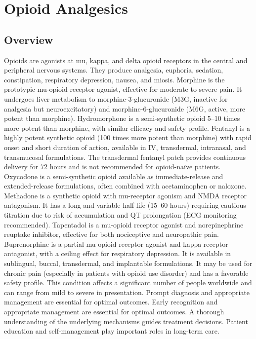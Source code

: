 \chapter{Opioid Analgesics}
\label{sec:Opioid Analgesics}

\section{Overview}
Opioids are agonists at mu, kappa, and delta opioid receptors in the central and peripheral nervous systems. They produce analgesia, euphoria, sedation, constipation, respiratory depression, nausea, and miosis. Morphine is the prototypic mu-opioid receptor agonist, effective for moderate to severe pain. It undergoes liver metabolism to morphine-3-glucuronide (M3G, inactive for analgesia but neuroexcitatory) and morphine-6-glucuronide (M6G, active, more potent than morphine). Hydromorphone is a semi-synthetic opioid 5--10 times more potent than morphine, with similar efficacy and safety profile. Fentanyl is a highly potent synthetic opioid (100 times more potent than morphine) with rapid onset and short duration of action, available in IV, transdermal, intranasal, and transmucosal formulations. The transdermal fentanyl patch provides continuous delivery for 72 hours and is not recommended for opioid-na{\"i}ve patients. Oxycodone is a semi-synthetic opioid available as immediate-release and extended-release formulations, often combined with acetaminophen or naloxone. Methadone is a synthetic opioid with mu-receptor agonism and NMDA receptor antagonism. It has a long and variable half-life (15--60 hours) requiring cautious titration due to risk of accumulation and QT prolongation (ECG monitoring recommended). Tapentadol is a mu-opioid receptor agonist and norepinephrine reuptake inhibitor, effective for both nociceptive and neuropathic pain. Buprenorphine is a partial mu-opioid receptor agonist and kappa-receptor antagonist, with a ceiling effect for respiratory depression. It is available in sublingual, buccal, transdermal, and implantable formulations. It may be used for chronic pain (especially in patients with opioid use disorder) and has a favorable safety profile. This condition affects a significant number of people worldwide and can range from mild to severe in presentation. Prompt diagnosis and appropriate management are essential for optimal outcomes. Early recognition and appropriate management are essential for optimal outcomes. A thorough understanding of the underlying mechanisms guides treatment decisions. Patient education and self-management play important roles in long-term care.
